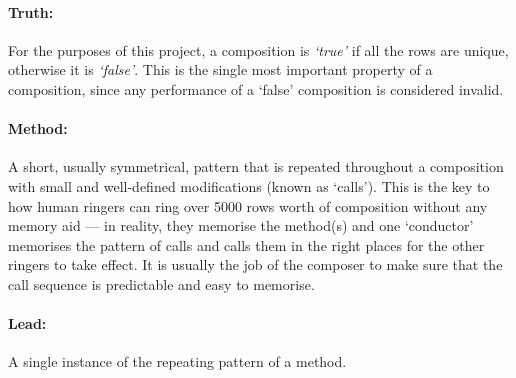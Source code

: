 \documentclass[12pt]{article}
\begin{document}
\paragraph{Truth:} For the purposes of this project, a composition is \emph{`true'} if all the rows
are unique, otherwise it is \emph{`false'}.  This is the single most important property of a
composition, since any performance of a `false' composition is considered invalid.

\paragraph{Method:} A short, usually symmetrical, pattern that is repeated throughout a composition
with small and well-defined modifications (known as `calls').  This is the key to how human ringers
can ring over 5000 rows worth of composition without any memory aid --- in reality, they memorise
the method(s) and one `conductor' memorises the pattern of calls and calls them in the right places
for the other ringers to take effect.  It is usually the job of the composer to make sure that the
call sequence is predictable and easy to memorise.

\paragraph{Lead:} A single instance of the repeating pattern of a method.
\end{document}
